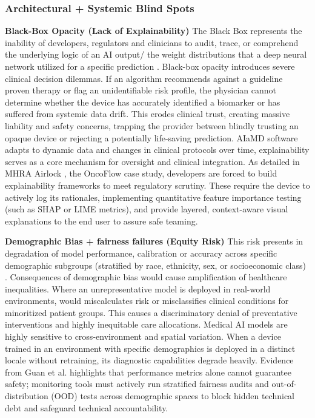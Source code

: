 \documentclass[11pt,a4paper]{article}
\begin{document}
\subsubsection{Architectural + Systemic Blind Spots}
\label{sec:Architectural + Systemic Blind Spots}

\textbf{Black-Box Opacity (Lack of Explainability)}
The Black Box represents the inability of developers, regulators and clinicians to audit, trace, or comprehend the underlying logic of an AI output/ the weight distributions that a deep neural network utilized for a specific prediction \cite{mhra2025} .
Black-box opacity introduces severe clinical decision dilemmas. If an algorithm recommends against a guideline proven therapy or flag an unidentifiable risk profile, the physician cannot determine whether the device has accurately identified a biomarker or has suffered from systemic data drift. This erodes clinical trust, creating massive liability and safety concerns, trapping the provider between blindly trusting an opaque device or rejecting a potentially life-saving prediction.
AIaMD software adapts to dynamic data and changes in clinical protocols over time, explainability serves as a core mechanism for oversight and clinical integration. As detailed in MHRA Airlock \cite{mhra2025} , the OncoFlow case study, developers are forced to build explainability frameworks to meet regulatory scrutiny. These require the device to actively log its rationales, implementing quantitative feature importance testing (such as SHAP or LIME metrics), and provide layered, context-aware visual explanations to the end user to assure safe teaming.

\textbf{Demographic Bias + fairness failures (Equity Risk)}
This risk presents in  degradation of model performance, calibration or accuracy across specific demographic subgroups (stratified by race, ethnicity, sex, or socioeconomic class) \cite{daneshjou2022disparities} \cite{guan2026} .
Consequences of demographic bias would cause amplification of healthcare inequalities. Where an unrepresentative model is deployed in real-world environments, would miscalculates risk or misclassifies clinical conditions for minoritized patient groups. This causes a discriminatory denial of preventative interventions and highly inequitable care allocations.
Medical AI models are highly sensitive to cross-environment and spatial variation. When a device trained in an environment with specific demographics is deployed in a distinct locale without retraining, its diagnostic capabilities degrade heavily. Evidence from Guan et al. \cite{guan2026} highlights that performance metrics alone cannot guarantee safety; monitoring tools must actively run stratified fairness audits and out-of-distribution (OOD) tests across demographic spaces to block hidden technical debt and safeguard technical accountability.
\end{document}
